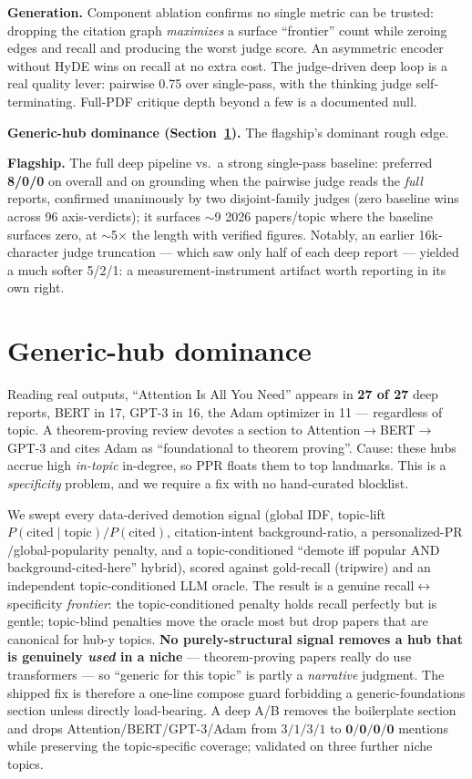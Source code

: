 \documentclass[11pt]{article}
\begin{document}
\textbf{Generation.} Component ablation confirms no single metric can be trusted: dropping the citation
graph \emph{maximizes} a surface ``frontier'' count while zeroing edges and recall and producing the
worst judge score. An asymmetric encoder without HyDE wins on recall at no extra cost. The judge-driven
deep loop is a real quality lever: pairwise 0.75 over single-pass, with the thinking judge
self-terminating. Full-PDF critique depth beyond a few is a documented null.

\textbf{Generic-hub dominance (Section~\ref{sec:hub}).} The flagship's dominant rough edge.

\textbf{Flagship.} The full deep pipeline vs.\ a strong single-pass baseline: preferred \textbf{8/0/0}
on overall and on grounding when the pairwise judge reads the \emph{full} reports, confirmed
unanimously by two disjoint-family judges (zero baseline wins across 96 axis-verdicts); it surfaces
$\sim$9 2026 papers/topic where the baseline surfaces zero, at $\sim$5$\times$ the length with
verified figures. Notably, an earlier 16k-character judge truncation --- which saw only half of each
deep report --- yielded a much softer 5/2/1: a measurement-instrument artifact worth reporting in its
own right.

\section{Generic-hub dominance}
\label{sec:hub}
Reading real outputs, ``Attention Is All You Need'' appears in \textbf{27 of 27} deep reports, BERT in
17, GPT-3 in 16, the Adam optimizer in 11 --- regardless of topic. A theorem-proving review devotes a
section to Attention$\rightarrow$BERT$\rightarrow$GPT-3 and cites Adam as ``foundational to theorem
proving''. Cause: these hubs accrue high \emph{in-topic} in-degree, so PPR floats them to top landmarks.
This is a \emph{specificity} problem, and we require a fix with no hand-curated blocklist.

We swept every data-derived demotion signal (global IDF, topic-lift $P(\text{cited}\mid\text{topic})/
P(\text{cited})$, citation-intent background-ratio, a personalized-PR$/$global-popularity penalty, and a
topic-conditioned ``demote iff popular AND background-cited-here'' hybrid), scored against gold-recall
(tripwire) and an independent topic-conditioned LLM oracle. The result is a genuine
recall$\leftrightarrow$specificity \emph{frontier}: the topic-conditioned penalty holds recall perfectly
but is gentle; topic-blind penalties move the oracle most but drop papers that are canonical for hub-y
topics. \textbf{No purely-structural signal removes a hub that is genuinely \emph{used} in a niche} ---
theorem-proving papers really do use transformers --- so ``generic for this topic'' is partly a
\emph{narrative} judgment. The shipped fix is therefore a one-line compose guard forbidding a
generic-foundations section unless directly load-bearing. A deep A/B removes the boilerplate section and
drops Attention/BERT/GPT-3/Adam from $3/1/3/1$ to $\mathbf{0/0/0/0}$ mentions while preserving the
topic-specific coverage; validated on three further niche topics.
\end{document}
